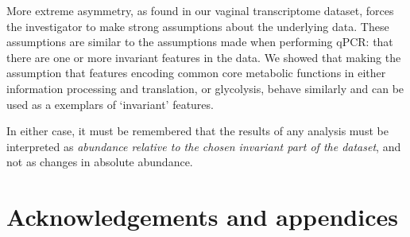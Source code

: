 \documentclass[10pt]{article}
\renewcommand{\refname}{\centerline{REFERENCES}}
\begin{document}
More extreme asymmetry, as found in our vaginal transcriptome dataset, forces the investigator to make strong assumptions about the underlying data. These assumptions are similar to the assumptions made when performing qPCR: that there are one or more invariant features in the data. We showed that making the assumption that features encoding common core metabolic functions in either information processing and translation, or glycolysis, behave similarly and can be used as a exemplars of `invariant' features. 

In either case, it must be remembered that the results of any analysis must be interpreted as \emph{abundance relative to the chosen invariant part of the dataset}, and not as changes in absolute abundance.

\section*{Acknowledgements and appendices}
\vskip-0.25cm

\renewcommand\refname{}
\vskip-1cm
% 

\end{document}
